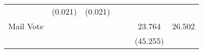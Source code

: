 \documentclass[12pt,twoside]{reedthesis}
\begin{document}
\begin{longtable}[]{@{}ccccccc@{}}
\begin{minipage}[t]{0.11\columnwidth}
  \strut
  \end{minipage} & \begin{minipage}[t]{0.11\columnwidth}\centering\strut
  (0.021)\strut
  \end{minipage} & \begin{minipage}[t]{0.12\columnwidth}\centering\strut
  (0.021)\strut
  \end{minipage}\tabularnewline
  \begin{minipage}[t]{0.14\columnwidth}\centering\strut
  Mail Vote\strut
  \end{minipage} & \begin{minipage}[t]{0.10\columnwidth}\centering\strut
  \strut
  \end{minipage} & \begin{minipage}[t]{0.11\columnwidth}\centering\strut
  \strut
  \end{minipage} & \begin{minipage}[t]{0.11\columnwidth}\centering\strut
  \strut
  \end{minipage} & \begin{minipage}[t]{0.11\columnwidth}\centering\strut
  \strut
  \end{minipage} & \begin{minipage}[t]{0.11\columnwidth}\centering\strut
  23.764\strut
  \end{minipage} & \begin{minipage}[t]{0.12\columnwidth}\centering\strut
  26.502\strut
  \end{minipage}\tabularnewline
  \begin{minipage}[t]{0.14\columnwidth}\centering\strut
  \strut
  \end{minipage} & \begin{minipage}[t]{0.10\columnwidth}\centering\strut
  \strut
  \end{minipage} & \begin{minipage}[t]{0.11\columnwidth}\centering\strut
  \strut
  \end{minipage} & \begin{minipage}[t]{0.11\columnwidth}\centering\strut
  \strut
  \end{minipage} & \begin{minipage}[t]{0.11\columnwidth}\centering\strut
  \strut
  \end{minipage} & \begin{minipage}[t]{0.11\columnwidth}\centering\strut
  (45.255)\strut
  \end{minipage} & \begin{minipage}[t]{0.12\columnwidth}\centering\strut

\end{minipage}
\end{longtable}
\end{document}
